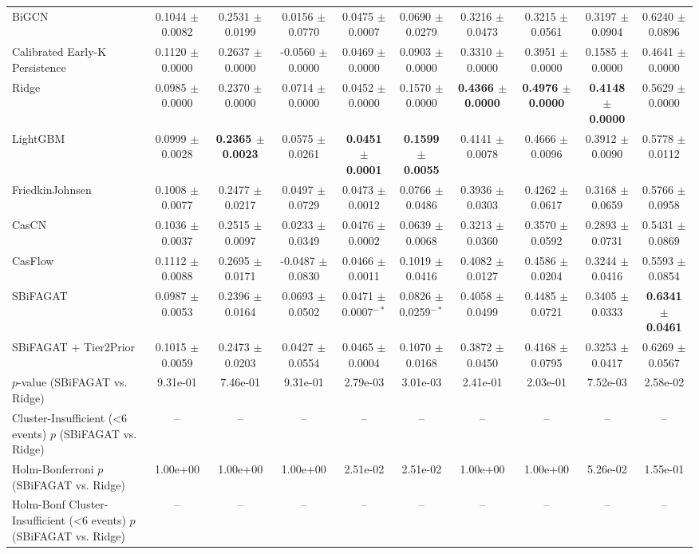 \begin{table}[t]
{\begin{tabular}{lccccccccc}
BiGCN & 0.1044 $\pm$ 0.0082 & 0.2531 $\pm$ 0.0199 & 0.0156 $\pm$ 0.0770 & 0.0475 $\pm$ 0.0007 & 0.0690 $\pm$ 0.0279 & 0.3216 $\pm$ 0.0473 & 0.3215 $\pm$ 0.0561 & 0.3197 $\pm$ 0.0904 & 0.6240 $\pm$ 0.0896 \\
Calibrated Early-K Persistence & 0.1120 $\pm$ 0.0000 & 0.2637 $\pm$ 0.0000 & -0.0560 $\pm$ 0.0000 & 0.0469 $\pm$ 0.0000 & 0.0903 $\pm$ 0.0000 & 0.3310 $\pm$ 0.0000 & 0.3951 $\pm$ 0.0000 & 0.1585 $\pm$ 0.0000 & 0.4641 $\pm$ 0.0000 \\
Ridge & 0.0985 $\pm$ 0.0000 & 0.2370 $\pm$ 0.0000 & 0.0714 $\pm$ 0.0000 & 0.0452 $\pm$ 0.0000 & 0.1570 $\pm$ 0.0000 & \textbf{0.4366 $\pm$ 0.0000} & \textbf{0.4976 $\pm$ 0.0000} & \textbf{0.4148 $\pm$ 0.0000} & 0.5629 $\pm$ 0.0000 \\
LightGBM & 0.0999 $\pm$ 0.0028 & \textbf{0.2365 $\pm$ 0.0023} & 0.0575 $\pm$ 0.0261 & \textbf{0.0451 $\pm$ 0.0001} & \textbf{0.1599 $\pm$ 0.0055} & 0.4141 $\pm$ 0.0078 & 0.4666 $\pm$ 0.0096 & 0.3912 $\pm$ 0.0090 & 0.5778 $\pm$ 0.0112 \\
FriedkinJohnsen & 0.1008 $\pm$ 0.0077 & 0.2477 $\pm$ 0.0217 & 0.0497 $\pm$ 0.0729 & 0.0473 $\pm$ 0.0012 & 0.0766 $\pm$ 0.0486 & 0.3936 $\pm$ 0.0303 & 0.4262 $\pm$ 0.0617 & 0.3168 $\pm$ 0.0659 & 0.5766 $\pm$ 0.0958 \\
CasCN & 0.1036 $\pm$ 0.0037 & 0.2515 $\pm$ 0.0097 & 0.0233 $\pm$ 0.0349 & 0.0476 $\pm$ 0.0002 & 0.0639 $\pm$ 0.0068 & 0.3213 $\pm$ 0.0360 & 0.3570 $\pm$ 0.0592 & 0.2893 $\pm$ 0.0731 & 0.5431 $\pm$ 0.0869 \\
CasFlow & 0.1112 $\pm$ 0.0088 & 0.2695 $\pm$ 0.0171 & -0.0487 $\pm$ 0.0830 & 0.0466 $\pm$ 0.0011 & 0.1019 $\pm$ 0.0416 & 0.4082 $\pm$ 0.0127 & 0.4586 $\pm$ 0.0204 & 0.3244 $\pm$ 0.0416 & 0.5593 $\pm$ 0.0854 \\
SBiFAGAT & 0.0987 $\pm$ 0.0053 & 0.2396 $\pm$ 0.0164 & 0.0693 $\pm$ 0.0502 & 0.0471 $\pm$ 0.0007$^{-*}$ & 0.0826 $\pm$ 0.0259$^{-*}$ & 0.4058 $\pm$ 0.0499 & 0.4485 $\pm$ 0.0721 & 0.3405 $\pm$ 0.0333 & \textbf{0.6341 $\pm$ 0.0461} \\
SBiFAGAT + Tier2Prior & 0.1015 $\pm$ 0.0059 & 0.2473 $\pm$ 0.0203 & 0.0427 $\pm$ 0.0554 & 0.0465 $\pm$ 0.0004 & 0.1070 $\pm$ 0.0168 & 0.3872 $\pm$ 0.0450 & 0.4168 $\pm$ 0.0795 & 0.3253 $\pm$ 0.0417 & 0.6269 $\pm$ 0.0567 \\
\midrule
$p$-value (SBiFAGAT vs. Ridge) & 9.31e-01 & 7.46e-01 & 9.31e-01 & 2.79e-03 & 3.01e-03 & 2.41e-01 & 2.03e-01 & 7.52e-03 & 2.58e-02 \\
Cluster-Insufficient (<6 events) $p$ (SBiFAGAT vs. Ridge) & -- & -- & -- & -- & -- & -- & -- & -- & -- \\
Holm-Bonferroni $p$ (SBiFAGAT vs. Ridge) & 1.00e+00 & 1.00e+00 & 1.00e+00 & 2.51e-02 & 2.51e-02 & 1.00e+00 & 1.00e+00 & 5.26e-02 & 1.55e-01 \\
Holm-Bonf Cluster-Insufficient (<6 events) $p$ (SBiFAGAT vs. Ridge) & -- & -- & -- & -- & -- & -- & -- & -- & -- \\
\bottomrule
\end{tabular}
}
\end{table}

